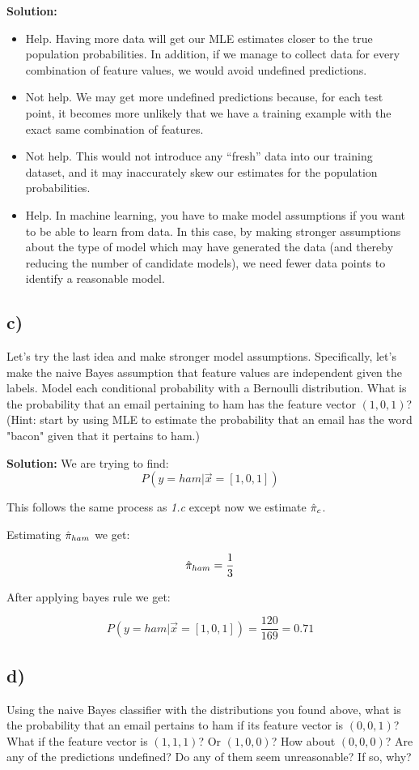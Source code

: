 \documentclass[a4paper]{article}
\begin{document}
\textbf{Solution:}

\begin{itemize}
    \item Help. Having more data will get our MLE estimates closer to the true population probabilities. In addition, if we manage to collect data for every combination of feature values, we would avoid undefined predictions.
    \item Not help. We may get more undefined predictions because, for each test point, it becomes more unlikely that we have a training example with the exact same combination of features.
    \item Not help. This would not introduce any “fresh” data into our training dataset, and it may inaccurately skew our estimates for the population probabilities.
    \item Help.  In machine learning, you have to make model assumptions if you want to be able to learn from data. In this case, by making stronger assumptions about the type of model which may have generated the data (and thereby reducing the number of candidate models), we need fewer data points to identify a reasonable model. 
\end{itemize}
\subsection*{c)}
Let's try the last idea and make stronger model assumptions. Specifically, let's make the naive Bayes assumption that feature values are independent given the labels. Model each conditional probability with a Bernoulli distribution. What is the probability that an email pertaining to ham has the feature vector $(1,0,1)$? (Hint: start by using MLE to estimate the probability that an email has the word "bacon" given that it pertains to ham.)

\textbf{Solution:}
We are trying to find:
$$P(y = ham | \vec{x} = [1,0,1])$$

This follows the same process as \emph{1.c} except now we estimate $\Hat{\pi}_{c}$.

Estimating $\Hat{\pi}_{ham}$ we get:

$$\Hat{\pi}_{ham} = \frac{1}{3}$$

After applying bayes rule we get:


$$P(y = ham | \vec{x} = [1,0,1]) = \frac{120}{169} = 0.71$$



\subsection*{d)}
Using the naive Bayes classifier with the distributions you found above, what is the probability that an email pertains to ham if its feature vector is $(0,0,1)$? What if the feature vector is $(1,1,1)$? Or $(1,0,0)$? How about $(0,0,0)$? Are any of the predictions undefined? Do any of them seem unreasonable? If so, why?
\end{document}

